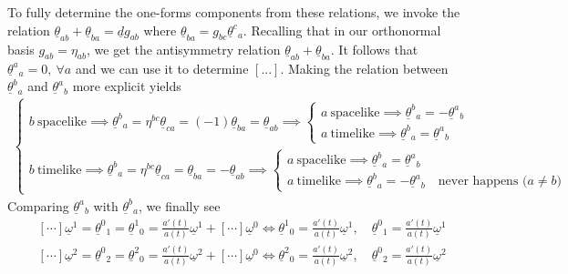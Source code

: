 \documentclass[10pt, a4paper]{article}
\begin{document}
{\begin{enumerate}
  To fully determine the one-forms components from these relations, we invoke the relation $\underline{\theta}_{ab} + \underline{\theta}_{ba} = \underline{d}g_{ab}$ where $\underline{\theta}_{ba} = g_{bc}\underline{\theta}^{c}{}_a$. Recalling that in our orthonormal basis $g_{ab} = \eta_{ab}$, we get the antisymmetry relation $\underline{\theta}_{ab} + \underline{\theta}_{ba}$. It follows that $\underline{\theta}^{a}{}_{a} = 0, \ \forall a$ and we can use it to determine $[...]$. Making the relation between $\underline{\theta}^{b}{}_a$ and  $\underline{\theta}^{a}{}_b$ more explicit yields
  \begin{align*}
    \begin{cases}
      b \ \text{spacelike} \implies 
      \underline{\theta}^{b}{}_a = \eta^{bc}\underline{\theta}_{ca} = (-1) \underline{\theta}_{ba} = \underline{\theta}_{ab} \implies 
      \begin{cases}
        a \ \text{spacelike} \implies \underline{\theta}^{b}{}_a = -\underline{\theta}^{a}{}_b\\
        a \ \text{timelike} \implies \underline{\theta}^{b}{}_a =   \underline{\theta}^{a}{}_b
      \end{cases}
        \\
      b \ \text{timelike} \implies 
      \underline{\theta}^{b}{}_a = \eta^{bc}\underline{\theta}_{ca} = \underline{\theta}_{ba} = -\underline{\theta}_{ab}  \implies 
      \begin{cases}
        a \ \text{spacelike} \implies \underline{\theta}^{b}{}_a = \underline{\theta}^{a}{}_b\\
        a \ \text{timelike} \implies \underline{\theta}^{b}{}_a = -\underline{\theta}^{a}{}_b \quad \text{never happens ($a \neq b$)}
      \end{cases}
    \end{cases}
  \end{align*}
  Comparing $\underline{\theta}^{a}{}_b$ with $\underline{\theta}^{b}{}_a$, we finally see 
  \begin{align*}
    &[\cdots] \underline{\omega}^1 = \underline{\theta}^0{ }_{1} = \underline{\theta}^1{ }_{0} = \frac{a'(t)}{a(t)}\underline{\omega}^1 + [\cdots] \underline{\omega}^0 \iff \underline{\theta}^1{ }_{0} = \frac{a'(t)}{a(t)}\underline{\omega}^1, \quad \underline{\theta}^0{ }_{1} = \frac{a'(t)}{a(t)}\underline{\omega}^1\\
    &[\cdots] \underline{\omega}^2 = \underline{\theta}^0{ }_{2} = \underline{\theta}^2{ }_{0} = \frac{a'(t)}{a(t)}\underline{\omega}^2 + [\cdots] \underline{\omega}^0 \iff \underline{\theta}^2{ }_{0} = \frac{a'(t)}{a(t)}\underline{\omega}^2, \quad \underline{\theta}^0{ }_{2} = \frac{a'(t)}{a(t)}\underline{\omega}^2\\

\end{align*}
\end{enumerate}}
\end{document}
